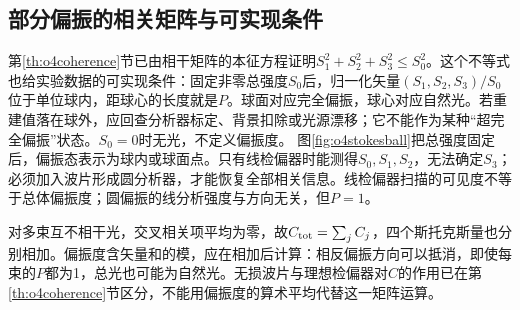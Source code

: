 \subsection{部分偏振的相关矩阵与可实现条件}
第\ref{th:o4coherence}节已由相干矩阵的本征方程证明$S_1^2+S_2^2+S_3^2\leq S_0^2$。这个不等式也给实验数据的可实现条件：固定非零总强度$S_0$后，归一化矢量$(S_1,S_2,S_3)/S_0$位于单位球内，距球心的长度就是$P$。球面对应完全偏振，球心对应自然光。若重建值落在球外，应回查分析器标定、背景扣除或光源漂移；它不能作为某种“超完全偏振”状态。$S_0=0$时无光，不定义偏振度。
图\ref{fig:o4stokesball}把总强度固定后，偏振态表示为球内或球面点。只有线检偏器时能测得$S_0,S_1,S_2$，无法确定$S_3$；必须加入波片形成圆分析器，才能恢复全部相关信息。线检偏器扫描的可见度不等于总体偏振度；圆偏振的线分析强度与方向无关，但$P=1$。

对多束互不相干光，交叉相关项平均为零，故$C_{\rm tot}=\sum_jC_j$，四个斯托克斯量也分别相加。偏振度含矢量和的模，应在相加后计算：相反偏振方向可以抵消，即使每束的$P$都为1，总光也可能为自然光。无损波片与理想检偏器对$C$的作用已在第\ref{th:o4coherence}节区分，不能用偏振度的算术平均代替这一矩阵运算。
